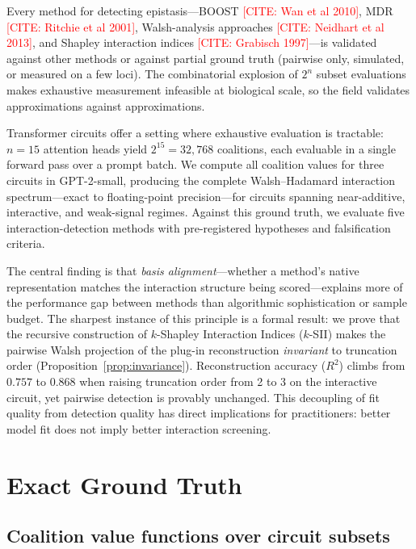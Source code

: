 \documentclass[11pt]{article}
\newcommand{\citeneeded}[1]{\textcolor{red}{[CITE: #1]}}
\begin{document}
Every method for detecting epistasis---BOOST \citeneeded{Wan et al 2010},
MDR \citeneeded{Ritchie et al 2001}, Walsh-analysis approaches
\citeneeded{Neidhart et al 2013}, and Shapley interaction indices
\citeneeded{Grabisch 1997}---is validated against other methods or
against partial ground truth (pairwise only, simulated, or measured on
a few loci). The combinatorial explosion of $2^n$ subset evaluations
makes exhaustive measurement infeasible at biological scale, so the
field validates approximations against approximations.

Transformer circuits offer a setting where exhaustive evaluation is
tractable: $n = 15$ attention heads yield $2^{15} = 32{,}768$
coalitions, each evaluable in a single forward pass over a prompt
batch. We compute all coalition values for three circuits in
GPT-2-small, producing the complete Walsh--Hadamard interaction
spectrum---exact to floating-point precision---for circuits spanning
near-additive, interactive, and weak-signal regimes. Against this
ground truth, we evaluate five interaction-detection methods with
pre-registered hypotheses and falsification criteria.

The central finding is that \emph{basis alignment}---whether a
method's native representation matches the interaction structure
being scored---explains more of the performance gap between methods
than algorithmic sophistication or sample budget.
The sharpest instance of this principle is a formal result:
we prove that the recursive construction of $k$-Shapley Interaction
Indices ($k$-SII) \citep{bordt2023shapley} makes the pairwise Walsh
projection of the plug-in reconstruction \emph{invariant} to
truncation order (Proposition~\ref{prop:invariance}).
Reconstruction accuracy ($R^2$) climbs from $0.757$ to $0.868$ when
raising truncation order from 2 to 3 on the interactive circuit, yet
pairwise detection is provably unchanged.
This decoupling of fit quality from detection quality has direct
implications for practitioners: better model fit does not imply
better interaction screening.


\section{Exact Ground Truth}
\label{sec:ground-truth}

\subsection{Coalition value functions over circuit subsets}
\end{document}

